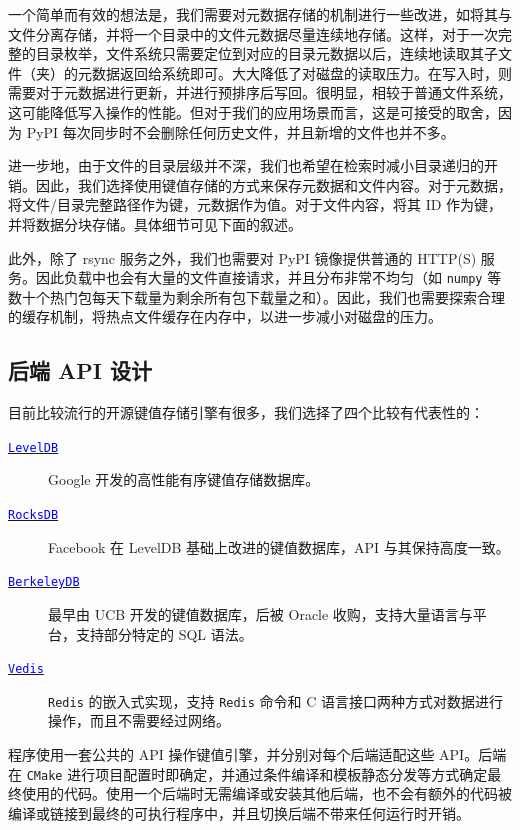 \documentclass{ctexart}
\begin{document}
一个简单而有效的想法是，我们需要对元数据存储的机制进行一些改进，如将其与文件分离存储，并将一个目录中的文件元数据尽量连续地存储。这样，对于一次完整的目录枚举，文件系统只需要定位到对应的目录元数据以后，连续地读取其子文件（夹）的元数据返回给系统即可。大大降低了对磁盘的读取压力。在写入时，则需要对于元数据进行更新，并进行预排序后写回。很明显，相较于普通文件系统，这可能降低写入操作的性能。但对于我们的应用场景而言，这是可接受的取舍，因为 PyPI 每次同步时不会删除任何历史文件，并且新增的文件也并不多。

进一步地，由于文件的目录层级并不深，我们也希望在检索时减小目录递归的开销。因此，我们选择使用键值存储的方式来保存元数据和文件内容。对于元数据，将文件/目录完整路径作为键，元数据作为值。对于文件内容，将其 ID 作为键，并将数据分块存储。具体细节可见下面的叙述。

此外，除了 rsync 服务之外，我们也需要对 PyPI 镜像提供普通的 HTTP(S) 服务。因此负载中也会有大量的文件直接请求，并且分布非常不均匀（如 \texttt{numpy} 等数十个热门包每天下载量为剩余所有包下载量之和）。因此，我们也需要探索合理的缓存机制，将热点文件缓存在内存中，以进一步减小对磁盘的压力。

\subsection{后端 API 设计}

目前比较流行的开源键值存储引擎有很多，我们选择了四个比较有代表性的：

\begin{description}
    \item[\href{https://github.com/google/leveldb}{\textcolor{blue}{\texttt{LevelDB}}}] Google 开发的高性能有序键值存储数据库。
    \item[\href{https://github.com/facebook/rocksdb}{\textcolor{blue}{\texttt{RocksDB}}}] Facebook 在 LevelDB 基础上改进的键值数据库，API 与其保持高度一致。
    \item[\href{https://www.oracle.com/database/technologies/related/berkeleydb.html}{\textcolor{blue}{\texttt{BerkeleyDB}}}] 最早由 UCB 开发的键值数据库，后被 Oracle 收购，支持大量语言与平台，支持部分特定的 SQL 语法。
    \item[\href{https://github.com/symisc/vedis}{\textcolor{blue}{\texttt{Vedis}}}] \texttt{Redis} 的嵌入式实现，支持 \texttt{Redis} 命令和 C 语言接口两种方式对数据进行操作，而且不需要经过网络。
\end{description}

程序使用一套公共的 API 操作键值引擎，并分别对每个后端适配这些 API。后端在 \texttt{CMake} 进行项目配置时即确定，并通过条件编译和模板静态分发等方式确定最终使用的代码。使用一个后端时无需编译或安装其他后端，也不会有额外的代码被编译或链接到最终的可执行程序中，并且切换后端不带来任何运行时开销。
\end{document}
